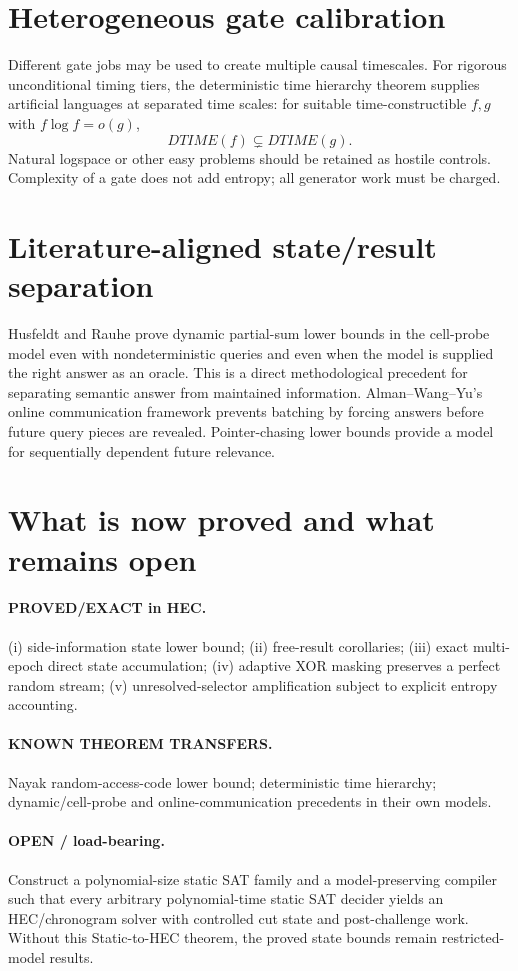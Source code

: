 \documentclass[11pt]{article}
\begin{document}
\section*{Heterogeneous gate calibration}
Different gate jobs may be used to create multiple causal timescales. For rigorous unconditional timing tiers, the deterministic time hierarchy theorem supplies artificial languages at separated time scales: for suitable time-constructible \(f,g\) with \(f\log f=o(g)\),
\[
DTIME(f)\subsetneq DTIME(g).
\]
Natural logspace or other easy problems should be retained as hostile controls. Complexity of a gate does not add entropy; all generator work must be charged.

\section*{Literature-aligned state/result separation}
Husfeldt and Rauhe prove dynamic partial-sum lower bounds in the cell-probe model even with nondeterministic queries and even when the model is supplied the right answer as an oracle. This is a direct methodological precedent for separating semantic answer from maintained information. Alman--Wang--Yu's online communication framework prevents batching by forcing answers before future query pieces are revealed. Pointer-chasing lower bounds provide a model for sequentially dependent future relevance.

\section*{What is now proved and what remains open}
\paragraph{PROVED/EXACT in HEC.}
(i) side-information state lower bound; (ii) free-result corollaries; (iii) exact multi-epoch direct state accumulation; (iv) adaptive XOR masking preserves a perfect random stream; (v) unresolved-selector amplification subject to explicit entropy accounting.

\paragraph{KNOWN THEOREM TRANSFERS.}
Nayak random-access-code lower bound; deterministic time hierarchy; dynamic/cell-probe and online-communication precedents in their own models.

\paragraph{OPEN / load-bearing.}
Construct a polynomial-size static SAT family and a model-preserving compiler such that every arbitrary polynomial-time static SAT decider yields an HEC/chronogram solver with controlled cut state and post-challenge work. Without this Static-to-HEC theorem, the proved state bounds remain restricted-model results.
\end{document}
